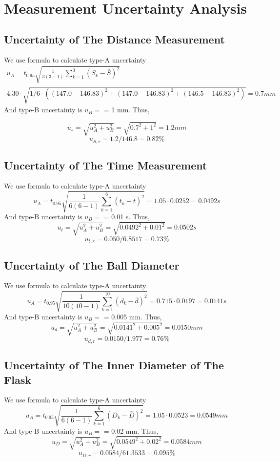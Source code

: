 \section{Measurement Uncertainty Analysis}

\subsection{Uncertainty of The Distance Measurement}
We use formula to calculate type-A uncertainty
\begin{multline*}
 u_A = t_{0.95} \sqrt{\frac{1}{3(3-1)} \sum_{k=1}^3{(S_k-\bar{S})^2} } = \\
4.30 \cdot \sqrt{1/6\cdot ( (147.0-  146.83)^2 +  (147.0-  146.83)^2 + (146.5-
  146.83)^2 ) } =   0.7 mm
\end{multline*}
And type-B uncertainty is $u_B = $ = 1 mm. Thus,

$$   u_s = \sqrt{u_A^2+u_B^2} = \sqrt{0.7^2+1^2} = 1.2 mm  $$
$$   u_{S,r} = 1.2 / 146.8 = 0.82 \% $$ 

\subsection{Uncertainty of The Time Measurement}
We use formula to calculate type-A uncertainty
\begin{equation}
 u_A = t_{0.95} \sqrt{\frac{1}{6(6-1)} \sum_{k=1}^6{(t_k-\bar{t})^2} } = 1.05
 \cdot 0.0252 = 0.0492 s
\end{equation}
And type-B uncertainty is $u_B = $ = 0.01 s. Thus,
$$   u_t = \sqrt{u_A^2+u_B^2} = \sqrt{0.0492^2+0.01^2} =  0.0502 s $$
$$   u_{t,r} = 0.050 / 6.8517= 0.73 \% $$ 


\subsection{Uncertainty of The Ball Diameter}
We use formula to calculate type-A uncertainty
\begin{equation}
  u_A = t_{0.95} \sqrt{\frac{1}{10(10-1)} \sum_{k=1}^{10}{(d_k-\bar{d})^2} }
 = 0.715  \cdot   0.0197 = 0.0141 s
\end{equation}
And type-B uncertainty is $u_B = $ = 0.005 mm. Thus,
$$   u_d = \sqrt{u_A^2+u_B^2} = \sqrt{0.0141^2+0.005^2} = 0.0150 mm $$
$$   u_{d,r} = 0.0150 / 1.977 =  0.76 \% $$ 

\subsection{Uncertainty of The Inner Diameter of The Flask}
We use formula to calculate type-A uncertainty
\begin{equation}
  u_A = t_{0.95} \sqrt{\frac{1}{6(6-1)} \sum_{k=1}^{6}{(D_k-\bar{D})^2} }
 = 1.05  \cdot 0.0523 =  0.0549 mm 
\end{equation}
And type-B uncertainty is $u_B = $ = 0.02 mm. Thus,
$$   u_D = \sqrt{u_A^2+u_B^2} = \sqrt{0.0549^2+0.02^2} = 0.0584 mm $$
$$   u_{D,r} = 0.0584 /  61.3533 =  0.095 \% $$ 

